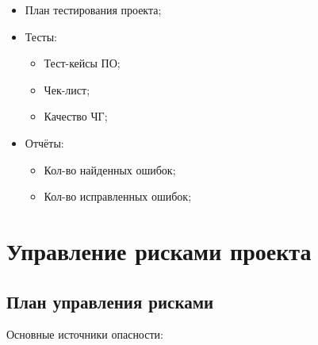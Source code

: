 \documentclass[a4paper,10pt]{article}
\begin{document}
        \begin{itemize}
            \item План тестирования проекта;
            \item Тесты:
                \begin{itemize}
                    \item Тест-кейсы ПО;
                    \item Чек-лист;
                    \item Качество ЧГ;
                \end{itemize}
            \item Отчёты:
                \begin{itemize}
                \item Кол-во найденных ошибок;
                \item Кол-во исправленных ошибок;
                \end{itemize}

        \end{itemize}

\section{Управление рисками проекта}

\subsection{План управления рисками}

Основные источники опасности:
\end{document}
